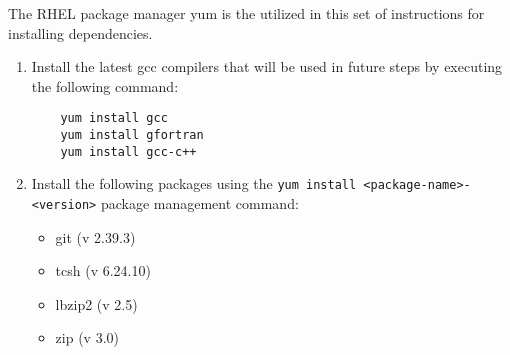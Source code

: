 
\noindent The \ac{RHEL} package manager yum is the utilized in this set of instructions for installing dependencies.


\begin{enumerate}
	\item Install the latest gcc compilers that will be used in future steps by executing the following command: \\
	
	\begin{verbatim}
	yum install gcc
	yum install gfortran
	yum install gcc-c++
	\end{verbatim}
	
	\item Install the following packages using the \texttt{yum install <package-name>-<version>} package management command:

	\begin{itemize}
		\item git (v 2.39.3)
		\item tcsh (v 6.24.10)
		\item lbzip2 (v 2.5)
		\item zip (v 3.0)
	\end{itemize}
\end{enumerate}

